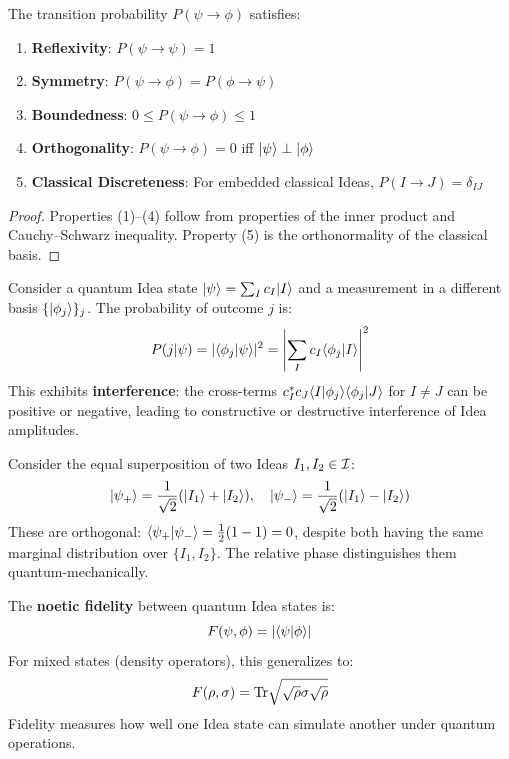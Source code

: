 \begin{proposition}
\label{prop:similarity-props}
The transition probability $P(\psi \to \phi)$ satisfies:
\begin{enumerate}
  \item \textbf{Reflexivity}: $P(\psi \to \psi) = 1$
  \item \textbf{Symmetry}: $P(\psi \to \phi) = P(\phi \to \psi)$
  \item \textbf{Boundedness}: $0 \leq P(\psi \to \phi) \leq 1$
  \item \textbf{Orthogonality}: $P(\psi \to \phi) = 0$ iff $|\psi\rangle \perp |\phi\rangle$
  \item \textbf{Classical Discreteness}: For embedded classical Ideas, $P(I \to J) = \delta_{IJ}$
\end{enumerate}
\end{proposition}

\begin{proof}
Properties (1)--(4) follow from properties of the inner product and Cauchy--Schwarz inequality. Property (5) is the orthonormality of the classical basis.
\end{proof}

\begin{definition}
\label{def:semantic-interference}
Consider a quantum Idea state $|\psi\rangle = \sum_I c_I |I\rangle$ and a measurement in a different basis $\{|\phi_j\rangle\}_j$. The probability of outcome $j$ is:
\[
P(j | \psi) = |\langle \phi_j | \psi \rangle|^2 = \left| \sum_I c_I \langle \phi_j | I \rangle \right|^2
\]
This exhibits \textbf{interference}: the cross-terms $c_I^* c_J \langle I|\phi_j\rangle \langle \phi_j | J \rangle$ for $I \neq J$ can be positive or negative, leading to constructive or destructive interference of Idea amplitudes.
\end{definition}

\begin{example}
\label{ex:superposition-interference}
Consider the equal superposition of two Ideas $I_1, I_2 \in \mathcal{I}$:
\[
|\psi_+\rangle = \frac{1}{\sqrt{2}}(|I_1\rangle + |I_2\rangle), \quad
|\psi_-\rangle = \frac{1}{\sqrt{2}}(|I_1\rangle - |I_2\rangle)
\]
These are orthogonal: $\langle \psi_+ | \psi_- \rangle = \frac{1}{2}(1 - 1) = 0$, despite both having the same marginal distribution over $\{I_1, I_2\}$. The relative phase distinguishes them quantum-mechanically.
\end{example}

\begin{definition}
\label{def:noetic-fidelity}
The \textbf{noetic fidelity} between quantum Idea states is:
\[
F(\psi, \phi) = |\langle \psi | \phi \rangle|
\]
For mixed states (density operators), this generalizes to:
\[
F(\rho, \sigma) = \mathrm{Tr}\sqrt{\sqrt{\rho}\sigma\sqrt{\rho}}
\]
Fidelity measures how well one Idea state can simulate another under quantum operations.
\end{definition}

